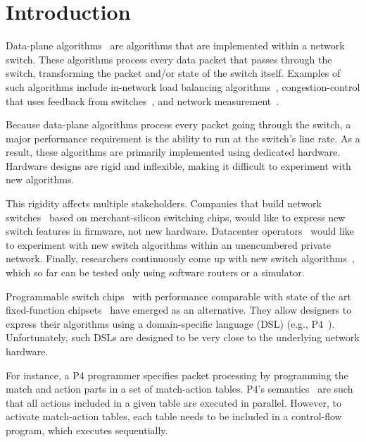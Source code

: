 \section{Introduction}
\label{s:intro}

Data-plane algorithms~\cite{cestan} are algorithms that are implemented within
a network switch. These algorithms process every data packet that passes
through the switch, transforming the packet and/or state of the switch itself.
Examples of such algorithms include in-network load balancing
algorithms~\cite{conga, ecmp}, congestion-control that uses feedback from
switches~\cite{xcp, rcp, pdq, dctcp}, and network measurement~\cite{opensketch,
bitmap_george, elephant_george}.

Because data-plane algorithms process every packet going through the switch, a
major performance requirement is the ability to run at the switch's line rate.
As a result, these algorithms are primarily implemented using dedicated
hardware. Hardware designs are rigid and inflexible, making it difficult to
experiment with new algorithms.

This rigidity affects multiple stakeholders. Companies that build network
switches~\cite{cisco_nexus, dell_force10, arista_7050} based on
merchant-silicon switching chips, would like to express new switch features in
firmware, not new hardware.  Datacenter operators~\cite{google_jupiter,
facebook, vl2, some_amazon_post} would like to experiment with new switch
algorithms within an unencumbered private network.  Finally, researchers
continuously come up with new switch algorithms~\cite{xcp, codel, d3, detail,
pdq}, which so far can be tested only using software routers or a simulator.

Programmable switch chips~\cite{flexpipe, xpliant, rmt} with
performance comparable with state of the art fixed-function
chipsets~\cite{trident, tomahawk, mellanox} have emerged as an alternative.
They allow designers to express their algorithms using a domain-specific
language (DSL) (e.g., P4~\cite{p4}).  Unfortunately, such DSLs are designed to
be very close to the underlying network hardware.

For instance, a P4 programmer specifies packet processing by programming the
match and action parts in a set of match-action tables. P4's
semantics~\cite{p4spec} are such that all actions included in a given table are
executed in parallel. However, to activate match-action tables, each table
needs to be included in a control-flow program, which executes sequentially.

